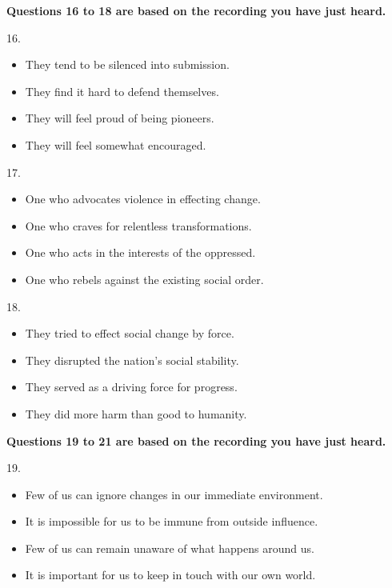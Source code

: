 \documentclass[UTF8,11pt]{ctexart}
\begin{document}
\textbf{Questions 16 to 18 are based on the recording you have just heard.}


16.


\begin{itemize}[leftmargin=2em,itemsep=.2em,topsep=.4em]\item[A.] They tend to be silenced into submission.
\item[B.] They find it hard to defend themselves.
\item[C.] They will feel proud of being pioneers.
\item[D.] They will feel somewhat encouraged.
\end{itemize}

17.


\begin{itemize}[leftmargin=2em,itemsep=.2em,topsep=.4em]\item[A.] One who advocates violence in effecting change.
\item[B.] One who craves for relentless transformations.
\item[C.] One who acts in the interests of the oppressed.
\item[D.] One who rebels against the existing social order.
\end{itemize}

18.


\begin{itemize}[leftmargin=2em,itemsep=.2em,topsep=.4em]\item[A.] They tried to effect social change by force.
\end{itemize}

\begin{itemize}[leftmargin=2em,itemsep=.2em,topsep=.4em]\item[B.] They disrupted the nation's social stability.
\item[C.] They served as a driving force for progress.
\item[D.] They did more harm than good to humanity.
\end{itemize}

\textbf{Questions 19 to 21 are based on the recording you have just heard.}


19.


\begin{itemize}[leftmargin=2em,itemsep=.2em,topsep=.4em]\item[A.] Few of us can ignore changes in our immediate environment.
\item[B.] It is impossible for us to be immune from outside influence.
\item[C.] Few of us can remain unaware of what happens around us.
\item[D.] It is important for us to keep in touch with our own world.
\end{itemize}
\end{document}
